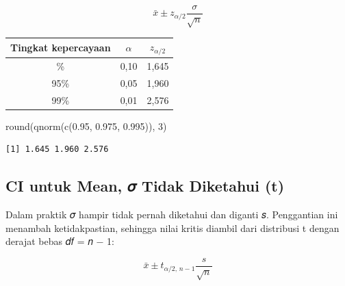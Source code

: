 \documentclass[
  indonesian,
  letterpaper,
]{book}
\newenvironment{Shaded}{\begin{snugshade}}{\end{snugshade}}
\newcommand{\DecValTok}[1]{\textcolor[rgb]{0.68,0.00,0.00}{#1}}
\newcommand{\FloatTok}[1]{\textcolor[rgb]{0.68,0.00,0.00}{#1}}
\newcommand{\FunctionTok}[1]{\textcolor[rgb]{0.28,0.35,0.67}{#1}}
\newcommand{\NormalTok}[1]{\textcolor[rgb]{0.00,0.23,0.31}{#1}}
\newcounter{none} %
\begin{document}
\[
\bar{x} \pm z_{\alpha/2}\frac{\sigma}{\sqrt{n}}
\]

{\def\LTcaptype{none} %
\begin{longtable}[]{@{}ccc@{}}
\toprule\noalign{}
Tingkat kepercayaan & \(\alpha\) & \(z_{\alpha/2}\) \\
\midrule\noalign{}
\endhead
\bottomrule\noalign{}
\endlastfoot
90\% & 0,10 & 1,645 \\
95\% & 0,05 & 1,960 \\
99\% & 0,01 & 2,576 \\
\end{longtable}
}

\begin{Shaded}
\begin{Highlighting}[]
\FunctionTok{round}\NormalTok{(}\FunctionTok{qnorm}\NormalTok{(}\FunctionTok{c}\NormalTok{(}\FloatTok{0.95}\NormalTok{, }\FloatTok{0.975}\NormalTok{, }\FloatTok{0.995}\NormalTok{)), }\DecValTok{3}\NormalTok{)}
\end{Highlighting}
\end{Shaded}

\begin{verbatim}
[1] 1.645 1.960 2.576
\end{verbatim}

\subsection{CI untuk Mean, 𝜎 Tidak Diketahui
(t)}\label{ci-untuk-mean-ux1d70e-tidak-diketahui-t}

Dalam praktik 𝜎 hampir tidak pernah diketahui dan diganti 𝑠. Penggantian
ini menambah ketidakpastian, sehingga nilai kritis diambil dari
distribusi t dengan derajat bebas 𝑑𝑓 = 𝑛 − 1:

\[
\bar{x} \pm t_{\alpha/2,\,n-1}\frac{s}{\sqrt{n}}
\]
\end{document}
